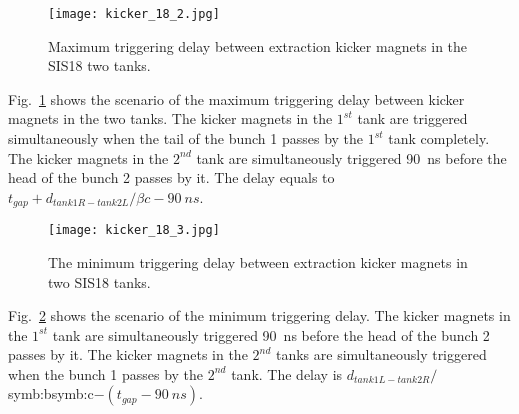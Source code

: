 \begin{figure}[H]
   \centering   
   \texttt{[image: kicker\_18\_2.jpg]}
   \caption{Maximum triggering delay between extraction kicker magnets in the SIS18 two tanks.}
   \label{kicker_18_2}
\end{figure}
Fig.~\ref{kicker_18_2} shows the scenario of the maximum triggering delay between kicker magnets in the two tanks. The kicker magnets in the $1^{st}$ tank are triggered simultaneously when the tail of the bunch 1 passes by the $1^{st}$ tank completely. The kicker magnets in the $2^{nd}$ tank are simultaneously triggered \SI{90}{ns} before the head of the bunch 2 passes by it. The delay equals to $t_\mathit{gap}+d_\mathit{tank1R-tank2L}/\beta c-\SI{90}{ns}$.
\begin{figure}[H]
   \centering   
   \texttt{[image: kicker\_18\_3.jpg]}
   \caption{The minimum triggering delay between extraction kicker magnets in two SIS18 tanks.}
   \label{kicker_18_3}
\end{figure}
Fig.~\ref{kicker_18_3} shows the scenario of the minimum triggering delay. The kicker magnets in the $1^{st}$ tank are simultaneously triggered \SI{90}{ns} before the head of the bunch 2 passes by it. The kicker magnets in the $2^{nd}$ tanks are simultaneously triggered when the bunch 1 passes by the $2^{nd}$ tank. The delay is $d_\mathit{tank1L-tank2R}/$\gls{symb:b}\gls{symb:c}$-(t_\mathit{gap}-\SI{90}{ns})$.

